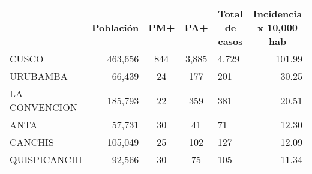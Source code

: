 \begin{tabular}{lrcclr}
	\rowcolor[HTML]{DCE6F1} 
	\multicolumn{1}{c}{\cellcolor[HTML]{DCE6F1}\textbf{PROVINCIA}} & \multicolumn{1}{c}{\cellcolor[HTML]{DCE6F1}\textbf{Población}} & \textbf{PM+}                                               & \textbf{PA+}         & \multicolumn{1}{c}{\cellcolor[HTML]{DCE6F1}\textbf{Total de casos}} & \multicolumn{1}{c}{\cellcolor[HTML]{DCE6F1}\textbf{Incidencia x 10,000 hab}} \\
	\cellcolor[HTML]{FF5050}CUSCO                                  & 463,656                                                        & 844                                                        & 3,885                & 4,729                                                               & 101.99                                                                       \\
	\cellcolor[HTML]{FFFF99}URUBAMBA                               & 66,439                                                         & 24                                                         & 177                  & 201                                                                 & 30.25                                                                        \\
	\cellcolor[HTML]{C6E0B4}LA   CONVENCION                        & 185,793                                                        & 22                                                         & 359                  & 381                                                                 & 20.51                                                                        \\
	\cellcolor[HTML]{C6E0B4}ANTA                                   & 57,731                                                         & 30                                                         & 41                   & 71                                                                  & 12.30                                                                        \\
	\cellcolor[HTML]{C6E0B4}CANCHIS                                & 105,049                                                        & 25                                                         & 102                  & 127                                                                 & 12.09                                                                        \\
	\cellcolor[HTML]{C6E0B4}QUISPICANCHI                           & 92,566                                                         & 30                                                         & 75                   & 105                                                                 & 11.34                                                                        \\

\end{tabular}
